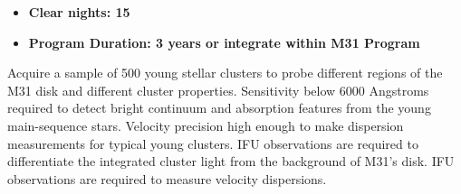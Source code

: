 \documentclass[11pt,a4paper,twoside,onecolumn,openany,final,oldfontcommands]{memoir}
\def\YST#1{\noindent{\textcolor{lblue}{\textbf[YST: #1]}}}
\begin{document}
\medskip
\begin{itemize}[leftmargin=0.3in, itemsep=0pt]
	\item[] \textbf{Clear nights: 15}
	\item[] \textbf{Program Duration: 3 years or integrate within M31 Program}
\end{itemize}


\begin{programrequirement}

\reqitem Acquire a sample of 500 young stellar clusters to probe different regions of the M31 disk and different cluster properties.
\reqitem Sensitivity below 6000 Angstroms required to detect bright continuum and absorption features from the young main-sequence stars.
\reqitem Velocity precision high enough to make dispersion measurements for typical young clusters.\YST{maybe be more specific?}  
\reqitem IFU observations are required to differentiate the integrated cluster light from the background of M31's disk.
\reqitem IFU observations are required to measure velocity dispersions.
\end{programrequirement}


\begin{sciencerequirement}
\reqitem {}
\reqitem {}
\end{sciencerequirement}


\end{document}
